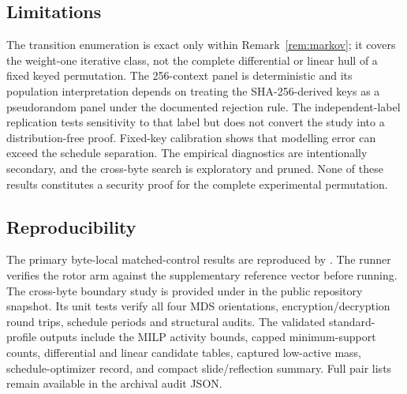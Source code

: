\documentclass[cryptography,article,submit,oneauthor]{Definitions/mdpi}
\begin{document}
\subsection{Limitations}\label{sec:6-4}
The transition enumeration is exact only within Remark~\ref{rem:markov}; it covers the weight-one iterative class, not the complete differential or linear hull of a fixed keyed permutation. The 256-context panel is deterministic and its population interpretation depends on treating the SHA-256-derived keys as a pseudorandom panel under the documented rejection rule. The independent-label replication tests sensitivity to that label but does not convert the study into a distribution-free proof. Fixed-key calibration shows that modelling error can exceed the schedule separation. The empirical diagnostics are intentionally secondary, and the cross-byte search is exploratory and pruned. None of these results constitutes a security proof for the complete experimental permutation.

\subsection{Reproducibility}\label{sec:6-3}
The primary byte-local matched-control results are reproduced by
{\footnotesize{}}. The runner verifies the rotor arm
against the supplementary reference vector before running. The cross-byte boundary study is
provided under  in the public repository snapshot. Its unit
tests verify all four MDS orientations, encryption/decryption round trips, schedule
periods and structural audits. The validated standard-profile outputs include the
MILP activity bounds, capped minimum-support counts, differential and linear
candidate tables, captured low-active mass, schedule-optimizer record, and compact
slide/reflection summary. Full pair lists remain available in the archival audit
JSON.

\end{document}
